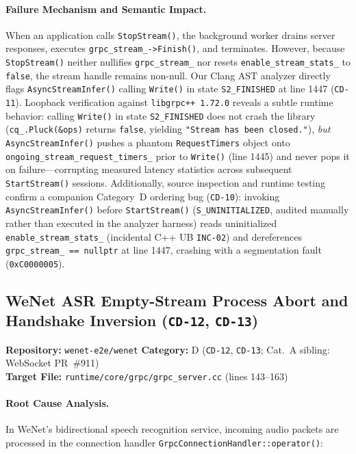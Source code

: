 \documentclass[11pt,a4paper]{article}
\begin{document}
\paragraph{Failure Mechanism and Semantic Impact.}
When an application calls \texttt{StopStream()}, the background worker drains server responses, executes \texttt{grpc\_stream\_->Finish()}, and terminates. However, because \texttt{StopStream()} neither nullifies \texttt{grpc\_stream\_} nor resets \texttt{enable\_stream\_stats\_} to \texttt{false}, the stream handle remains non-null. Our Clang AST analyzer directly flags \texttt{AsyncStreamInfer()} calling \texttt{Write()} in state \texttt{S2\_FINISHED} at line 1447 (\texttt{CD-11}). Loopback verification against \texttt{libgrpc++ 1.72.0} reveals a subtle runtime behavior: calling \texttt{Write()} in state \texttt{S2\_FINISHED} does not crash the library (\texttt{cq\_.Pluck(\&ops)} returns \texttt{false}, yielding \texttt{"Stream has been closed."}), \emph{but} \texttt{AsyncStreamInfer()} pushes a phantom \texttt{RequestTimers} object onto \texttt{ongoing\_stream\_request\_timers\_} prior to \texttt{Write()} (line 1445) and never pops it on failure---corrupting measured latency statistics across subsequent \texttt{StartStream()} sessions. Additionally, source inspection and runtime testing confirm a companion Category~D ordering bug (\texttt{CD-10}): invoking \texttt{AsyncStreamInfer()} before \texttt{StartStream()} (\texttt{S\_UNINITIALIZED}, audited manually rather than executed in the analyzer harness) reads uninitialized \texttt{enable\_stream\_stats\_} (incidental C++ UB \texttt{INC-02}) and dereferences \texttt{grpc\_stream\_ == nullptr} at line 1447, crashing with a segmentation fault (\texttt{0xC0000005}).

\subsection{WeNet ASR Empty-Stream Process Abort and Handshake Inversion (\texttt{CD-12}, \texttt{CD-13})}
\textbf{Repository:} \texttt{wenet-e2e/wenet} \hfill \textbf{Category:} D (\texttt{CD-12}, \texttt{CD-13}; Cat.~A sibling: WebSocket PR~\#911)\\
\textbf{Target File:} \texttt{runtime/core/grpc/grpc\_server.cc} (lines 143--163)

\paragraph{Root Cause Analysis.}
In WeNet's bidirectional speech recognition service, incoming audio packets are processed in the connection handler \texttt{GrpcConnectionHandler::operator()}:
\end{document}
